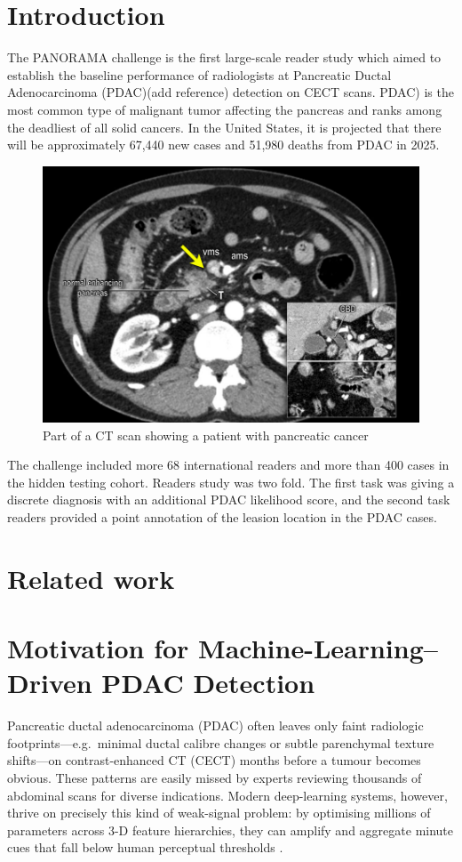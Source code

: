 \documentclass[conference]{IEEEtran}
\begin{document}
\section{Introduction}
The PANORAMA\cite{b5}  challenge is the first large-scale reader study which aimed to establish the baseline performance of radiologists at Pancreatic Ductal Adenocarcinoma (PDAC)(add reference) detection on CECT scans. PDAC) is the most common type of malignant tumor affecting the pancreas and ranks among the deadliest of all solid cancers. In the United States, it is projected that there will be approximately 67,440 new cases and 51,980 deaths from PDAC in 2025\cite{b2}.
\begin{figure}
    \centering
    \includegraphics[width=0.75\linewidth]{pancreatic_cancer.jpg}
    \caption{Part of a CT scan showing a patient with pancreatic cancer\cite{b6}}
    \label{fig:ct_scan}
\end{figure}
The challenge included more  68 international readers and more than 400 cases in the hidden testing cohort. Readers study was two fold. The first task was giving a discrete diagnosis with an additional PDAC likelihood score, and the second task readers provided a point annotation of the leasion location in the PDAC cases.

\section{Related work}
\section{Motivation for Machine-Learning–Driven PDAC Detection}
Pancreatic ductal adenocarcinoma (PDAC) often leaves only faint radiologic footprints—e.g.\ minimal ductal calibre changes or subtle parenchymal texture shifts—on contrast-enhanced CT (CECT) months before a tumour becomes obvious.  These patterns are easily missed by experts reviewing thousands of abdominal scans for diverse indications.  Modern deep-learning systems, however, thrive on precisely this kind of weak-signal problem: by optimising millions of parameters across 3-D feature hierarchies, they can amplify and aggregate minute cues that fall below human perceptual thresholds \cite{Esteva2017,McKinney2020}.
\end{document}
